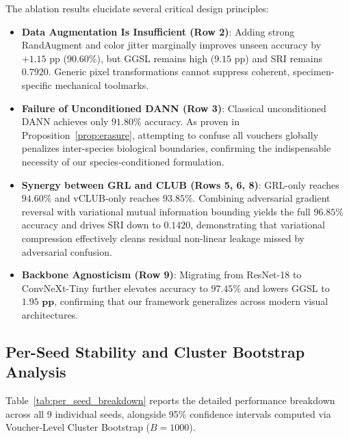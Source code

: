 \documentclass[a4paper,fleqn]{cas-sc}
\begin{document}
The ablation results elucidate several critical design principles:
\begin{itemize}
    \item \textbf{Data Augmentation Is Insufficient (Row 2)}: Adding strong RandAugment and color jitter marginally improves unseen accuracy by $+1.15\text{ pp}$ ($90.60\%$), but GGSL remains high ($9.15\text{ pp}$) and SRI remains $0.7920$. Generic pixel transformations cannot suppress coherent, specimen-specific mechanical toolmarks.
    \item \textbf{Failure of Unconditioned DANN (Row 3)}: Classical unconditioned DANN achieves only $91.80\%$ accuracy. As proven in Proposition~\ref{prop:erasure}, attempting to confuse all vouchers globally penalizes inter-species biological boundaries, confirming the indispensable necessity of our species-conditioned formulation.
    \item \textbf{Synergy between GRL and CLUB (Rows 5, 6, 8)}: GRL-only reaches $94.60\%$ and vCLUB-only reaches $93.85\%$. Combining adversarial gradient reversal with variational mutual information bounding yields the full $\mathbf{96.85\%}$ accuracy and drives SRI down to $\mathbf{0.1420}$, demonstrating that variational compression effectively cleans residual non-linear leakage missed by adversarial confusion.
    \item \textbf{Backbone Agnosticism (Row 9)}: Migrating from ResNet-18 to ConvNeXt-Tiny further elevates accuracy to $\mathbf{97.45\%}$ and lowers GGSL to $\mathbf{1.95\text{ pp}}$, confirming that our framework generalizes across modern visual architectures.
\end{itemize}

\subsection{Per-Seed Stability and Cluster Bootstrap Analysis}
Table~\ref{tab:per_seed_breakdown} reports the detailed performance breakdown across all 9 individual seeds, alongside 95\% confidence intervals computed via Voucher-Level Cluster Bootstrap ($B=1000$).
\end{document}
